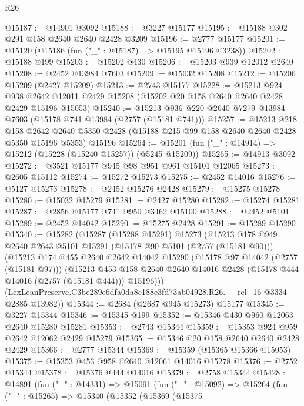 \begin{lexlean}{R26}
\begin{coremodule}
@15187 := @14901 @3092
@15188 := @3227 @15177
@15195 := @15188 @302 @291 @158 @2640 @2640 @2428 @3209
@15196 := @2777 @15177
@15201 := @15120 (@15186 (fun ("_" : @15187) => @15195 @15196 @3238))
@15202 := @15188 @199
@15203 := @15202 @430
@15206 := @15203 @939 @12012 @2640
@15208 := @2452 @13984 @7603
@15209 := @15032 @15208
@15212 := @15206 @15209 (@2427 @15209)
@15213 := @2743 @15177
@15228 := @15213
    @924
    @938
    @2642
    @12011
    @2429
    @15208
    (@15202 @20 @158 @2640 @2640 @2428 @2429 @15196 @15053)
@15240 := @15213 @936 @220 @2640 @7279 @13984 @7603 (@15178 @741 @13984 (@2757 (@15181 @741)))
@15257 := @15213
    @218
    @158
    @2642
    @2640
    @5350
    @2428
    (@15188 @215 @99 @158 @2640 @2640 @2428 @5350 @15196 @5353)
    @15196
@15264 := @15201 (fun ("_" : @14914) => @15212 (@15228 (@15240 @15257)) (@5245 @15209))
@15265 := @14913 @3092
@15272 := @3521 @15177 @945 @98 @951 @961 @15101 @12065
@15273 := @2605 @15112
@15274 := @15272 @15273
@15275 := @2452 @14016
@15276 := @5127 @15273
@15278 := @2452 @15276 @2428
@15279 := @15275 @15278
@15280 := @15032 @15279
@15281 := @2427 @15280
@15282 := @15274 @15281
@15287 := @2856 @15177 @741 @950 @3462 @15100
@15288 := @2452 @5101
@15289 := @2452 @14042
@15290 := @15275 @2428
@15291 := @15289 @15290
@15340 := @15282
    (@15287
      (@15288 @15291)
      @15273
      (@15213
        @178
        @949
        @2640
        @2643
        @5101
        @15291
        (@15178 @90 @5101 (@2757 (@15181 @90)))
        (@15213
          @174
          @455
          @2640
          @2642
          @14042
          @15290
          (@15178 @97 @14042 (@2757 (@15181 @97)))
          (@15213
            @453
            @158
            @2640
            @2640
            @14016
            @2428
            (@15178 @444 @14016 (@2757 (@15181 @444)))
            @15196)))
      (LexLeanPreserve.C3be289e6dfa0da8c188e3fd73ab04928.R26.__rel_16 @3334 @2885 @13982))
@15344 := @2684 (@2687 @945 @15273) @15177
@15345 := @3227 @15344
@15346 := @15345 @199
@15352 := @15346 @430 @960 @12063 @2640 @15280 @15281
@15353 := @2743 @15344
@15359 := @15353 @924 @959 @2642 @12062 @2429 @15279
@15365 := @15346 @20 @158 @2640 @2640 @2428 @2429
@15366 := @2777 @15344
@15369 := @15359 (@15365 @15366 @15053)
@15375 := @15353 @453 @958 @2640 @12061 @14016 @15278
@15376 := @2752 @15344
@15378 := @15376 @444 @14016
@15379 := @2758 @15344
@15428 := @14891
    (fun ("_" : @14331) =>
    @15091
      (fun ("_" : @15092) =>
      @15264
        (fun ("_" : @15265) =>
        @15340
          (@15352
            (@15369
              (@15375

\end{coremodule}
\end{lexlean}
